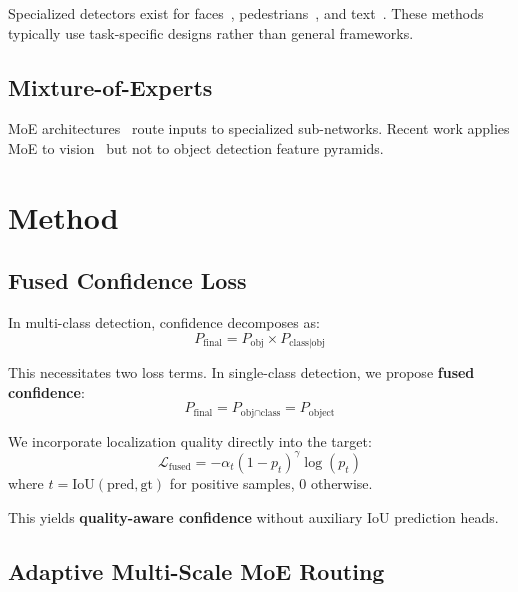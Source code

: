 \documentclass[conference]{IEEEtran}
\begin{document}
Specialized detectors exist for faces~\cite{zhang2016mtcnn}, pedestrians~\cite{dollar2012pedestrian}, and text~\cite{liao2017textboxes}. These methods typically use task-specific designs rather than general frameworks.

\subsection{Mixture-of-Experts}

MoE architectures~\cite{shazeer2017outrageously,riquelme2021scaling} route inputs to specialized sub-networks. Recent work applies MoE to vision~\cite{riquelme2021scaling} but not to object detection feature pyramids.


\section{Method}

\subsection{Fused Confidence Loss}
\label{sec:loss}

In multi-class detection, confidence decomposes as:
\begin{equation}
P_{\text{final}} = P_{\text{obj}} \times P_{\text{class}|\text{obj}}
\end{equation}

This necessitates two loss terms. In single-class detection, we propose \textbf{fused confidence}:
\begin{equation}
P_{\text{final}} = P_{\text{obj} \cap \text{class}} = P_{\text{object}}
\end{equation}

We incorporate localization quality directly into the target:
\begin{equation}
\mathcal{L}_{\text{fused}} = -\alpha_t (1 - p_t)^\gamma \log(p_t)
\end{equation}
where $t = \text{IoU}(\text{pred}, \text{gt})$ for positive samples, 0 otherwise.

This yields \textbf{quality-aware confidence} without auxiliary IoU prediction heads.

\subsection{Adaptive Multi-Scale MoE Routing}
\label{sec:moe}
\end{document}
